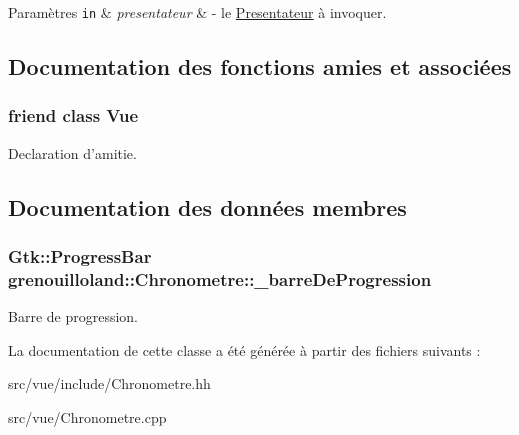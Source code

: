 \begin{DoxyParams}[1]{Paramètres}
\mbox{\tt in}  & {\em presentateur} & -\/ le \hyperlink{classgrenouilloland_1_1Presentateur}{Presentateur} à invoquer. \\
\hline
\end{DoxyParams}


\subsection{Documentation des fonctions amies et associées}
\hypertarget{classgrenouilloland_1_1Chronometre_adc3b1810b8d3988a7832f57c330fe4fd}{
\subsubsection[{Vue}]{\setlength{\rightskip}{0pt plus 5cm}friend class {\bf Vue}\hspace{0.3cm}{\ttfamily [friend]}}}\label{classgrenouilloland_1_1Chronometre_adc3b1810b8d3988a7832f57c330fe4fd}
Declaration d'amitie. 

\subsection{Documentation des données membres}
\hypertarget{classgrenouilloland_1_1Chronometre_a0d69d261d1caf45e33f310cbc3132d6d}{
\subsubsection[{\-\_\-barre\-De\-Progression}]{\setlength{\rightskip}{0pt plus 5cm}Gtk\-::\-Progress\-Bar grenouilloland\-::\-Chronometre\-::\-\_\-barre\-De\-Progression\hspace{0.3cm}{\ttfamily [protected]}}}\label{classgrenouilloland_1_1Chronometre_a0d69d261d1caf45e33f310cbc3132d6d}
Barre de progression. 

La documentation de cette classe a été générée à partir des fichiers suivants \-:\begin{DoxyCompactItemize}
\item 
src/vue/include/Chronometre.\-hh\item 
src/vue/Chronometre.\-cpp\end{DoxyCompactItemize}
